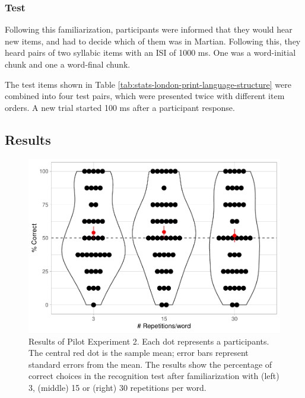 \documentclass[]{article}
\begin{document}
\subsubsection{Test}

Following this familiarization, participants were informed that they would hear new items, and had to decide which of them was in Martian. Following this, they heard pairs of two syllabic items with an ISI of 1000 ms. One was a word-initial chunk and one a word-final chunk.

The test items shown in Table \ref{tab:stats-london-print-language-structure} were combined into four test pairs, which were presented twice with different item orders. A new trial started 100 ms after a participant response.

\subsection{Results}

\begin{figure}

{\centering \includegraphics[width=0.8\linewidth]{segmentation_recall_combined_files/figure-latex/bcn-plot-stats-1} 

}

\caption{Results of Pilot Experiment 2. Each dot represents a participants. The central red dot is the sample mean; error bars represent standard errors from the mean. The results show the percentage of correct choices in the recognition test after familiarization with (left) 3, (middle) 15  or (right) 30 repetitions per word.}\label{fig:bcn-plot-stats}
\end{figure}
\end{document}
